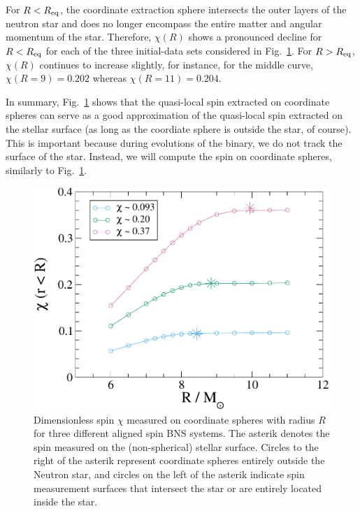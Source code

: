 \documentclass[aps,prd,amsmath,floatfix
,twocolumn
,superscriptaddress,nofootinbib,showpacs]{revtex4-1}
\theoremstyle{plain} \newtheorem{thm}{Theorem} \newtheorem{lem}{Lemma}
\begin{document}
For $R<R_{\rm eq}$, the coordinate extraction sphere intersects the
outer layers of the neutron star and  does no longer
encompass the entire matter and angular momentum of the star.
Therefore, $\chi(R)$ shows a pronounced decline for $R<R_{\rm eq}$ for
each of the three initial-data sets considered in Fig.~\ref{fig:ChiVR}.
For $R>R_{\rm eq}$, $\chi(R)$ continues to increase slightly, for
instance, for the middle curve, $\chi(R=9)=0.202$ whereas
$\chi(R=11)=0.204$.

In summary, Fig.~\ref{fig:ChiVR} shows that the quasi-local spin
extracted on coordinate spheres can serve as a good approximation of
the quasi-local spin extracted on the stellar surface (as long as the
coordiate sphere is outside the star, of course).
This is important because during evolutions of the
binary, we do not track the surface of the star.
Instead, we will compute the spin on coordinate spheres, similarly to Fig.~\ref{fig:ChiVR}.

\begin{figure}
\includegraphics[width=0.95\columnwidth]{ChiVR}
\caption{{\label{fig:ChiVR}}Dimensionless spin $\chi$ measured on
  coordinate spheres with radius $R$ for three different aligned spin
  BNS systems.  The asterik denotes the spin measured on the
  (non-spherical) stellar surface.  Circles to the right of the
  asterik represent coordinate spheres entirely outside the Neutron
  star, and circles on the left of the asterik indicate spin
  measurement surfaces that intersect the star or are entirely located
  inside the star.}
\end{figure}
\end{document}
